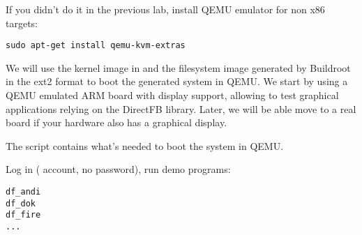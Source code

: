 If you didn't do it in the previous lab, install QEMU emulator for non
x86 targets:

\begin{verbatim}
sudo apt-get install qemu-kvm-extras
\end{verbatim}

We will use the kernel image in  and the filesystem image
generated by Buildroot in the ext2 format to boot the generated system
in QEMU. We start by using a QEMU emulated ARM board with display
support, allowing to test graphical applications relying on the
DirectFB library. Later, we will be able move to a real board if your
hardware also has a graphical display.

The  script contains what's needed to boot the system
in QEMU.

Log in ( account, no password), run demo programs:

\begin{verbatim}
df_andi
df_dok
df_fire
...
\end{verbatim}







